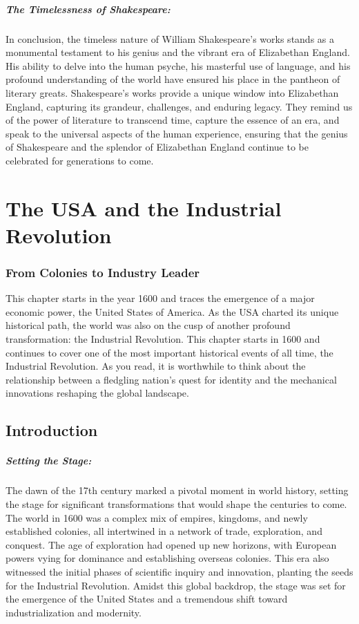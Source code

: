 \documentclass{book}
\begin{document}
\paragraph{The Timelessness of Shakespeare:}
In conclusion, the timeless nature of William Shakespeare’s works stands as a monumental testament to his genius and the vibrant era of Elizabethan England. His ability to delve into the human psyche, his masterful use of language, and his profound understanding of the world have ensured his place in the pantheon of literary greats. Shakespeare’s works provide a unique window into Elizabethan England, capturing its grandeur, challenges, and enduring legacy. They remind us of the power of literature to transcend time, capture the essence of an era, and speak to the universal aspects of the human experience, ensuring that the genius of Shakespeare and the splendor of Elizabethan England continue to be celebrated for generations to come.

\chapter{The USA and the Industrial Revolution}
\subsection*{From Colonies to Industry Leader}
This chapter starts in the year 1600 and traces the emergence of a major economic power, the United States of America. As the USA charted its unique historical path, the world was also on the cusp of another profound transformation: the Industrial Revolution. This chapter starts in 1600 and continues to cover one of the most important historical events of all time, the Industrial Revolution. As you read, it is worthwhile to think about the relationship between a fledgling nation's quest for identity and the mechanical innovations reshaping the global landscape.

\section*{Introduction}

\paragraph{Setting the Stage:}
The dawn of the 17th century marked a pivotal moment in world history, setting the stage for significant transformations that would shape the centuries to come. The world in 1600 was a complex mix of empires, kingdoms, and newly established colonies, all intertwined in a network of trade, exploration, and conquest. The age of exploration had opened up new horizons, with European powers vying for dominance and establishing overseas colonies. This era also witnessed the initial phases of scientific inquiry and innovation, planting the seeds for the Industrial Revolution. Amidst this global backdrop, the stage was set for the emergence of the United States and a tremendous shift toward industrialization and modernity.
\end{document}
